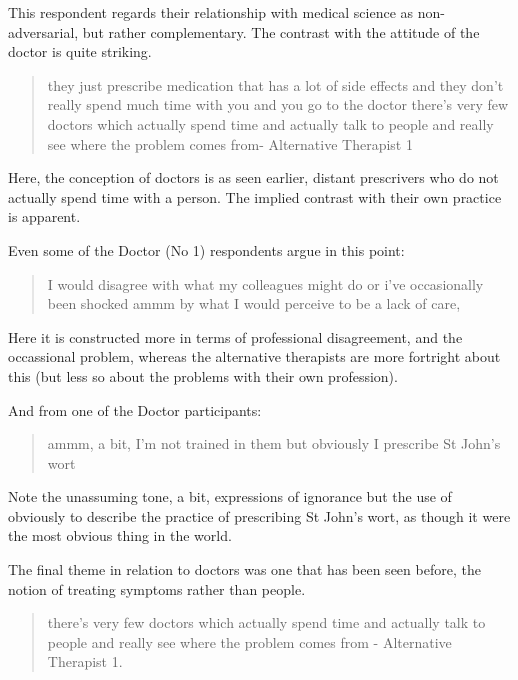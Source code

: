 This respondent regards their relationship with medical science as non-adversarial, but rather complementary. The contrast with the attitude of the doctor is quite striking. 


\begin{quotation}
  they just prescribe medication that has a lot of side effects and they don't really spend much time with you and you go to the doctor there's very few doctors which actually spend time and actually talk to people and really see where the problem comes from-
Alternative Therapist 1
\end{quotation}

Here, the conception of doctors is as seen earlier, distant prescrivers who do not actually spend time with a person. The implied contrast with their own practice is apparent. 

Even some of the Doctor (No 1) respondents argue in this point:

\begin{quotation}
  I would disagree with what my colleagues might do or i've occasionally been shocked ammm by what I would perceive to be a lack of care,

\end{quotation}

Here it is constructed more in terms of professional disagreement, and the occassional problem, whereas the alternative therapists are more fortright about this (but less so about the problems with their own profession). 

And from one of the Doctor participants: 

\begin{quotation}
  ammm, a bit, I'm not trained in them but obviously I prescribe St John's wort

\end{quotation}

Note the unassuming tone, a bit, expressions of ignorance but the use of obviously to describe the practice of prescribing St John's wort, as though it were the most obvious thing in the world. 

The final theme in relation to doctors was one that has been seen before, the notion of treating symptoms rather than people. 

\begin{quotation}
  there's very few doctors which actually spend time and actually talk to people and really see where the problem comes from
- Alternative Therapist 1.
\end{quotation}

